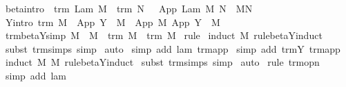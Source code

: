 \begin{isabellebody}
{\isacharbar}\ beta{\isacharbrackleft}intro{\isacharbrackright}{\isacharcolon}\ {\isachardoublequoteopen}{\isasymlbrakk}\ trm\ {\isacharparenleft}Lam\ M{\isacharparenright}\ {\isacharsemicolon}\ trm\ N\ {\isasymrbrakk}\ {\isasymLongrightarrow}\ App\ {\isacharparenleft}Lam\ M{\isacharparenright}\ N\ {\isasymRightarrow}\ M{\isacharcircum}N{\isachardoublequoteclose}\isanewline
{\isacharbar}\ Y{\isacharbrackleft}intro{\isacharbrackright}{\isacharcolon}\ {\isachardoublequoteopen}trm\ M\ {\isasymLongrightarrow}\ App\ {\isacharparenleft}Y\ {\isasymsigma}{\isacharparenright}\ M\ {\isasymRightarrow}\ App\ M\ {\isacharparenleft}App\ {\isacharparenleft}Y\ {\isasymsigma}{\isacharparenright}\ M{\isacharparenright}{\isachardoublequoteclose}\isanewline
\isanewline
{}\isamarkupfalse%
\ trm{\isacharunderscore}beta{\isacharunderscore}Y{\isacharunderscore}simp{}{\isacharcolon}\ {\isachardoublequoteopen}M\ {\isasymRightarrow}\ M{\isacharprime}\ {\isasymLongrightarrow}\ trm\ M\ {\isasymand}\ trm\ M{\isacharprime}{\isachardoublequoteclose}\isanewline
%
\isadelimproof
%
\endisadelimproof
%
\isatagproof
{}\isamarkupfalse%
\ rule\isanewline
{}\isamarkupfalse%
\ {\isacharparenleft}induct\ M{\isacharprime}\ rule{\isacharcolon}beta{\isacharunderscore}Y{\isachardot}induct{\isacharparenright}\isanewline
{}\isamarkupfalse%
\ {\isacharparenleft}subst\ trm{\isachardot}simps{\isacharcomma}\ simp{\isacharparenright}{\isacharplus}\isanewline
{}\isamarkupfalse%
\ auto{\isacharbrackleft}{}{\isacharbrackright}\isanewline
{}\isamarkupfalse%
\ {\isacharparenleft}simp\ add{\isacharcolon}\ lam\ trm{\isachardot}app{\isacharparenright}\isanewline
{}\isamarkupfalse%
\ {\isacharparenleft}simp\ add{\isacharcolon}\ trm{\isachardot}Y\ trm{\isachardot}app{\isacharparenright}\isanewline
{}\isamarkupfalse%
\ {\isacharparenleft}induct\ M\ M{\isacharprime}\ rule{\isacharcolon}beta{\isacharunderscore}Y{\isachardot}induct{\isacharparenright}\isanewline
{}\isamarkupfalse%
\ {\isacharparenleft}subst\ trm{\isachardot}simps{\isacharcomma}\ simp{\isacharparenright}{\isacharplus}\isanewline
{}\isamarkupfalse%
\ auto{\isacharbrackleft}{}{\isacharbrackright}\isanewline
{}\isamarkupfalse%
\ {\isacharparenleft}rule\ trm{\isacharunderscore}opn{\isacharparenright}\isanewline
{}\isamarkupfalse%
\ {\isacharparenleft}simp\ add{\isacharcolon}\ lam{\isacharparenright}\isanewline
{}\isamarkupfalse%

\end{isabellebody}
